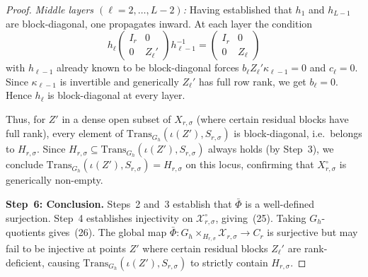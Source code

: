 \documentclass{article}
\theoremstyle{definition}
\begin{document}
\begin{proof}
\emph{Middle layers $(\ell = 2, \dots, L{-}2)$:}  Having established that $h_1$ and $h_{L-1}$ are block-diagonal, one propagates inward.  At each layer the condition
\[
h_\ell \begin{pmatrix} I_r & 0 \\ 0 & Z_\ell' \end{pmatrix} h_{\ell-1}^{-1}
= \begin{pmatrix} I_r & 0 \\ 0 & Z_\ell \end{pmatrix}
\]
with $h_{\ell-1}$ already known to be block-diagonal forces $b_\ell Z_\ell' \kappa_{\ell-1} = 0$ and $c_\ell = 0$.  Since $\kappa_{\ell-1}$ is invertible and generically $Z_\ell'$ has full row rank, we get $b_\ell = 0$.  Hence $h_\ell$ is block-diagonal at every layer.

Thus, for $Z'$ in a dense open subset of $X_{r,\sigma}$ (where certain residual blocks have full rank), every element of $\mathrm{Trans}_{G_h}(\iota(Z'), S_{r,\sigma})$ is block-diagonal, i.e.\ belongs to $H_{r,\sigma}$.  Since $H_{r,\sigma} \subseteq \mathrm{Trans}_{G_h}(\iota(Z'), S_{r,\sigma})$ always holds (by Step~3), we conclude $\mathrm{Trans}_{G_h}(\iota(Z'), S_{r,\sigma}) = H_{r,\sigma}$ on this locus, confirming that $X_{r,\sigma}^{\circ}$ is generically non-empty.

\medskip
\textbf{Step~6: Conclusion.}
Steps~2 and~3 establish that $\bar\Phi$ is a well-defined surjection.  Step~4 establishes injectivity on $\mathcal X_{r,\sigma}^{\circ}$, giving~(25).  Taking $G_h$-quotients gives~(26).  The global map $\bar\Phi \colon G_h \times_{H_{r,\sigma}} \mathcal X_{r,\sigma} \to C_r$ is surjective but may fail to be injective at points $Z'$ where certain residual blocks $Z_\ell'$ are rank-deficient, causing $\mathrm{Trans}_{G_h}(\iota(Z'), S_{r,\sigma})$ to strictly contain $H_{r,\sigma}$.
\end{proof}
\end{document}
